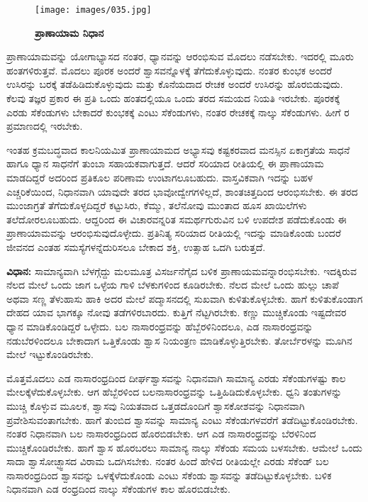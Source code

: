 \begin{center}
\end{center}


\begin{figure}
\texttt{[image: images/035.jpg]}
\caption{\textbf{ಪ್ರಾಣಾಯಾಮ ನಿಧಾನ} }
\end{figure}

ಪ್ರಾಣಾಯಾಮವನ್ನು ಯೋಗಾಭ್ಯಾಸದ ನಂತರ, ಧ್ಯಾನವನ್ನು ಆರಂಭಿಸುವ ಮೊದಲು ನಡೆಸಬೇಕು. ಇದರಲ್ಲಿ ಮೂರು ಹಂತಗಳಿರುತ್ತವೆ. ಮೊದಲು ಪೂರಕ ಅಂದರೆ ಶ್ವಾಸವನ್ನೊಳಕ್ಕೆ ತೆಗೆದುಕೊಳ್ಳುವುದು. ನಂತರ ಕುಂಭಕ ಅಂದರೆ ಉಸಿರನ್ನು ಬರಕ್ಕೆ ತಡೆಹಿಡಿದುಕೊಳ್ಳುವುದು ಮತ್ತು ಕೊನೆಯದಾದ ರೇಚಕ ಅಂದರೆ ಉಸಿರನ್ನು ಹೊರಬಿಡುವುದು. ಕೆಲವು ತಜ್ಞರ ಪ್ರಕಾರ ಈ ಪ್ರತಿ ಒಂದು ಹಂತದಲ್ಲಿಯೂ ಒಂದು ತರದ ಸಮಯದ ನಿಯತಿ ಇರಬೇಕು. ಪೂರಕಕ್ಕೆ ಎರಡು ಸೆಕೆಂಡುಗಳು ಬೇಕಾದರೆ ಕುಂಭಕಕ್ಕೆ ಎಂಟು ಸೆಕೆಂಡುಗಳು, ನಂತರ ರೇಚಕಕ್ಕೆ ನಾಲ್ಕು ಸೆಕೆಂಡುಗಳು. ಹೀಗೆ  ರ ಪ್ರಮಾಣದಲ್ಲಿ ಇರಬೇಕು.

ಇಂತಹ ಕ್ರಮಬದ್ಧವಾದ ಕಾಲನಿಯಮಿತ ಪ್ರಾಣಾಯಾಮದ ಅಭ್ಯಾಸವು ಕಷ್ಟಕರವಾದ ಮನಸ್ಸಿನ ಏಕಾಗ್ರತೆಯ ಸಾಧನೆ ಹಾಗೂ ಧ್ಯಾನ ಸಾಧನೆಗೆ ತುಂಬಾ ಸಹಾಯಕವಾಗುತ್ತದೆ. ಆದರೆ ಸರಿಯಾದ ರೀತಿಯಲ್ಲಿ ಈ ಪ್ರಾಣಾಯಾಮ ಮಾಡದಿದ್ದರೆ ಅದರಿಂದ ಪ್ರತಿಕೂಲ ಪರಿಣಾಮ ಉಂಟಾಗಲೂಬಹುದು. ವಾಸ್ತವಿಕವಾಗಿ ಇದನ್ನು ಬಹಳ ಎಚ್ಚರಿಕೆಯಿಂದ, ನಿಧಾನವಾಗಿ ಯಾವುದೇ ತರದ ಭಾವೋದ್ವೇಗಗಳಿಲ್ಲದೆ, ಶಾಂತಚಿತ್ತದಿಂದ ಆರಂಭಿಸಬೇಕು. ಈ ತರದ ಮುಂಜಾಗ್ರತೆ ತೆಗೆದುಕೊಳ್ಳದಿದ್ದರೆ ಕಟ್ಟುಸಿರು, ಕೆಮ್ಮು, ತಲೆನೋವು ಮುಂತಾದ ಹೂಸ ಖಾಯಿಲೆಗಳು ತಲೆದೋರಲೂಬಹುದು. ಆದ್ದರಿಂದ ಈ ವಿಚಾರವನ್ನರಿತ ಸಮರ್ಥಗುರುವಿನ ಬಳಿ ಉಪದೇಶ ಪಡೆದುಕೊಂಡು ಈ ಪ್ರಾಣಾಯಾಮವನ್ನು ಆರಂಭಿಸುವುದೊಳ್ಳೇದು. ಪ್ರತಿನಿತ್ಯ ಸರಿಯಾದ ರೀತಿಯಲ್ಲಿ ಇದನ್ನು ಮಾಡಿಕೊಂಡು ಬಂದರೆ ಜೀವನದ ಎಂತಹ ಸಮಸ್ಯೆಗಳನ್ನೆದುರಿಸಲೂ ಬೇಕಾದ ಶಕ್ತಿ, ಉತ್ಸಾಹ ಒದಗಿ ಬರುತ್ತದೆ.

\textbf{ವಿಧಾನ:} ಸಾಮಾನ್ಯವಾಗಿ ಬೆಳಗ್ಗೆದ್ದು ಮಲಮೂತ್ರ ವಿಸರ್ಜನೆಗೈದ ಬಳಿಕ ಪ್ರಾಣಾಯಮವನ್ನಾರಂಭಿಸಬೇಕು. ಇದಕ್ಕಿರುವ ನೆಲದ ಮೇಲೆ ಒಂದು ಜಾಗ ಒಳ್ಳೆಯ ಗಾಳಿ ಬೆಳಕುಗಳಿಂದ ಕೂಡಿರಬೇಕು. ನೆಲದ ಮೇಲೆ ಒಂದು ಹುಲ್ಲು ಚಾಪೆ ಅಥವಾ ಸಣ್ಣ ತೆಳುಹಾಸು ಹಾಕಿ ಅದರ ಮೇಲೆ ಪದ್ಮಾಸನದಲ್ಲಿ ಸುಖವಾಗಿ ಕುಳಿತುಕೊಳ್ಳಬೇಕು. ಹಾಗೆ ಕುಳಿತುಕೊಂಡಾಗ ದೇಹದ ಯಾವ ಭಾಗಕ್ಕೂ ನೋವು ತಡೆಗಳಿರಬಾರದು. ಕುತ್ತಿಗೆ ನೆಟ್ಟಗಿರಬೇಕು. ಕಣ್ಣು ಮುಚ್ಚಿಕೊಂಡು ಇಷ್ಟದೇವರ ಧ್ಯಾನ ಮಾಡಿಕೊಂಡಿದ್ದರೆ ಒಳ್ಳೇದು. ಬಲ ನಾಸಾರಂಧ್ರವನ್ನು ಹೆಬ್ಬೆರಳಿನಿಂದಲೂ, ಎಡ ನಾಸಾರಂಧ್ರವನ್ನು ನಡುಬೆರಳಿಂದಲೂ ಬೇಕಾದಾಗ ಒತ್ತಿಕೊಂಡು ಶ್ವಾಸ ನಿಯಂತ್ರಣ ಮಾಡಿಕೊಳ್ಳುತ್ತಿರಬೇಕು. ತೋರ್ಬೆರಳನ್ನು ಮೂಗಿನ ಮೇಲೆ ಇಟ್ಟುಕೊಂಡಿರಬೇಕು.

ಮೊತ್ತಮೊದಲು ಎಡ ನಾಸಾರಂಧ್ರದಿಂದ ದೀರ್ಘಶ್ವಾಸವನ್ನು ನಿಧಾನವಾಗಿ ಸಾಮಾನ್ಯ ಎರಡು ಸೆಕೆಂಡುಗಳಷ್ಟು ಕಾಲ ಮೇಲಕ್ಕೆಳೆದುಕೊಳ್ಳಬೇಕು. ಆಗ ಹೆಬ್ಬೆರಳಿಂದ ಬಲನಾಸಾರಂಧ್ರವನ್ನು ಒತ್ತಿಹಿಡಿದುಕೊಳ್ಳಬೇಕು. ಧ್ವನಿ ತಂತುಗಳನ್ನು ಮುಚ್ಚಿ ಕೊಳ್ಳುವ ಮೂಲಕ, ಶ್ವಾಸವು ನಿಯತವಾದ ಒತ್ತಡದೊಂದಿಗೆ ಶ್ವಾಸಕೋಶವನ್ನು ನಿಧಾನವಾಗಿ ಪ್ರವೇಶಿಸುವಂತಾಗಬೇಕು. ಹಾಗೆ ತುಂಬಿದ ಶ್ವಾಸವನ್ನು ಸಾಮಾನ್ಯ ಎಂಟು ಸೆಕೆಂಡುಗಳವರೆಗೆ ತಡೆದಿಟ್ಟುಕೊಂಡಿರಬೇಕು. ನಂತರ ನಿಧಾನವಾಗಿ ಬಲ ನಾಸಾರಂಧ್ರದಿಂದ ಹೊರಬಿಡಬೇಕು. ಆಗ ಎಡ ನಾಸಾರಂಧ್ರವನ್ನು ಬೆರಳಿನಿಂದ ಮುಚ್ಚಿಕೊಂಡಿರಬೇಕು. ಹಾಗೆ ಶ್ವಾಸ ಹೊರಬರಲು ಸಾಮಾನ್ಯ ನಾಲ್ಕು ಸೆಕೆಂಡು ಸಮಯ ಬಳಸಬೇಕು. ಆಮೇಲೆ ಒಂದು ಸಾದಾ ಶ್ವಾಸೋಚ್ಛ್ವಾಸದ ವಿರಾಮ ಒದಗಿಸಬೇಕು. ನಂತರ ಹಿಂದೆ ಹೇಳಿದ ರೀತಿಯಲ್ಲೇ ಎರಡು ಸೆಕೆಂಡ್ ಬಲ ನಾಸಾರಂಧ್ರದಿಂದ ಶ್ವಾಸವನ್ನು ಒಳಕ್ಕೆಳೆದುಕೊಂಡು ಎಂಟು ಸೆಕೆಂಡು ಶ್ವಾಸವನ್ನು ತಡೆದಿಟ್ಟುಕೊಳ್ಳಬೇಕು. ಬಳಿಕ ನಿಧಾನವಾಗಿ ಎಡ ರಂಧ್ರದಿಂದ ನಾಲ್ಕು ಸೆಕೆಂಡುಗಳ ಕಾಲ ಹೊರಬಿಡಬೇಕು.

